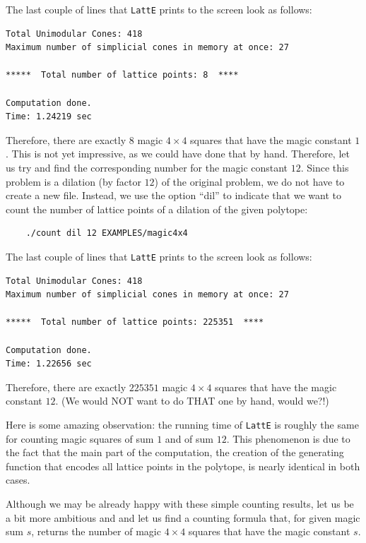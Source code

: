 \documentclass{article}
\begin{document}
The last couple of lines that {\tt LattE} prints to the screen
look as follows:
\begin{verbatim}
Total Unimodular Cones: 418
Maximum number of simplicial cones in memory at once: 27

*****  Total number of lattice points: 8  ****

Computation done.
Time: 1.24219 sec
\end{verbatim}
Therefore, there are exactly $8$ magic $4\times 4$ squares that
have the magic constant $1$. This is not yet impressive, as we could
have done that by hand. Therefore, let us try and find the
corresponding number for the magic constant $12$. Since this problem
is a dilation (by factor $12$) of the original problem, we do not have
to create a new file. Instead, we use the option ``dil'' to indicate
that we want to count the number of lattice points of a dilation of
the given polytope:
\begin{verbatim}
    ./count dil 12 EXAMPLES/magic4x4
\end{verbatim}
The last couple of lines that {\tt LattE} prints to the screen
look as follows:
\begin{verbatim}
Total Unimodular Cones: 418
Maximum number of simplicial cones in memory at once: 27

*****  Total number of lattice points: 225351  ****

Computation done.
Time: 1.22656 sec
\end{verbatim}
Therefore, there are exactly $225351$ magic $4\times 4$ squares that
have the magic constant $12$. (We would NOT want to do THAT one by
hand, would we?!) 

Here is some amazing observation: the running time of {\tt LattE}
is roughly the same for counting magic squares of sum $1$ and of sum
$12$. This phenomenon is due to the fact that the main part of the
computation, the creation of the generating function that encodes all
lattice points in the polytope, is nearly identical in both cases.

Although we may be already happy with these simple counting results,
let us be a bit more ambitious and and let us find a counting formula
that, for given magic sum $s$, returns the number of magic 
$4\times 4$ squares that have the magic constant $s$.
\end{document}
